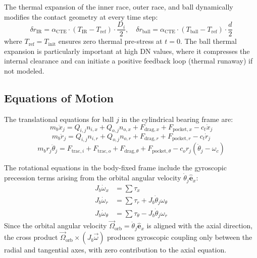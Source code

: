 \documentclass[preprint,12pt]{elsarticle}
\begin{document}
The thermal expansion of the inner race, outer race, and ball dynamically modifies the contact geometry at every time step:
\begin{equation}
    \delta r_{\text{IR}} = \alpha_{\text{CTE}} \cdot (T_{\text{IR}} - T_{\text{ref}}) \cdot \frac{D_i}{2}, \quad
    \delta r_{\text{ball}} = \alpha_{\text{CTE}} \cdot (T_{\text{ball}} - T_{\text{ref}}) \cdot \frac{d}{2}
    \label{eq:thermal_expansion}
\end{equation}
where $T_{\text{ref}} = T_{\text{init}}$ ensures zero thermal pre-stress at $t = 0$. The ball thermal expansion is particularly important at high DN values, where it compresses the internal clearance and can initiate a positive feedback loop (thermal runaway) if not modeled.


\subsection{Equations of Motion}
\label{sec:eom}

The translational equations for ball $j$ in the cylindrical bearing frame are:
\begin{equation}
    m_b \ddot{x}_j = Q_{i,j} n_{i,x} + Q_{o,j} n_{o,x} + F_{\text{drag},x} + F_{\text{pocket},x} - c_t \dot{x}_j
\end{equation}
\begin{equation}
    m_b \ddot{r}_j = Q_{i,j} n_{i,r} + Q_{o,j} n_{o,r} + F_{\text{drag},r} + F_{\text{pocket},r} - c_t \dot{r}_j
\end{equation}
\begin{equation}
    m_b r_j \ddot{\theta}_j = F_{\text{trac},i} + F_{\text{trac},o} + F_{\text{drag},\theta} + F_{\text{pocket},\theta} - c_o r_j(\dot{\theta}_j - \omega_c)
\end{equation}

The rotational equations in the body-fixed frame include the gyroscopic precession terms arising from the orbital angular velocity $\dot{\theta}_j \hat{\bm{e}}_x$:
\begin{align}
    J_b \dot{\omega}_x &= \sum \tau_x \label{eq:gyro_x} \\
    J_b \dot{\omega}_r &= \sum \tau_r + J_b \dot{\theta}_j \omega_{\theta} \label{eq:gyro_r} \\
    J_b \dot{\omega}_{\theta} &= \sum \tau_{\theta} - J_b \dot{\theta}_j \omega_r \label{eq:gyro_theta}
\end{align}
Since the orbital angular velocity $\vec{\Omega}_{\text{orb}} = \dot{\theta}_j \hat{\bm{e}}_x$ is aligned with the axial direction, the cross product $\vec{\Omega}_{\text{orb}} \times (J_b \vec{\omega})$ produces gyroscopic coupling only between the radial and tangential axes, with zero contribution to the axial equation.
\end{document}
